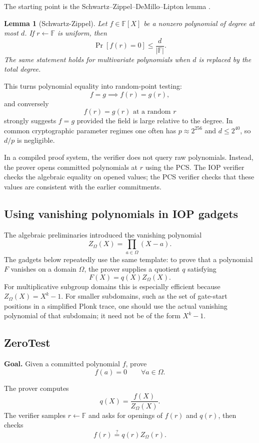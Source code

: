 \documentclass[11pt]{article}
\newcommand{\F}{\mathbb{F}}
\newtheorem{lemma}{Lemma}
\begin{document}
The starting point is the Schwartz--Zippel--DeMillo--Lipton lemma \cite{DeMilloLipton1978,Schwartz1980,Zippel1979}.

\begin{lemma}[Schwartz-Zippel]
Let $f\in \F[X]$ be a nonzero polynomial of degree at most $d$. If $r\leftarrow \F$ is uniform, then
\[
\Pr[f(r)=0]\le \frac{d}{|\F|}.
\]
The same statement holds for multivariate polynomials when $d$ is replaced by the total degree.
\end{lemma}

This turns polynomial equality into random-point testing:
\[
    f=g \implies f(r)=g(r),
\]
and conversely
\[
    f(r)=g(r) \text{ at a random }r
\]
strongly suggests $f=g$ provided the field is large relative to the degree. In common cryptographic parameter regimes one often has $p\approx 2^{256}$ and $d\le 2^{40}$, so $d/p$ is negligible.

In a compiled proof system, the verifier does not query raw polynomials. Instead, the prover opens committed polynomials at $r$ using the PCS. The IOP verifier checks the algebraic equality on opened values; the PCS verifier checks that these values are consistent with the earlier commitments.

\subsection{Using vanishing polynomials in IOP gadgets}

The algebraic preliminaries introduced the vanishing polynomial
\[
    Z_\Omega(X)=\prod_{a\in\Omega}(X-a).
\]
The gadgets below repeatedly use the same template: to prove that a polynomial $F$ vanishes on a domain $\Omega$, the prover supplies a quotient $q$ satisfying
\[
    F(X)=q(X)Z_\Omega(X).
\]
For multiplicative subgroup domains this is especially efficient because $Z_\Omega(X)=X^k-1$. For smaller subdomains, such as the set of gate-start positions in a simplified Plonk trace, one should use the actual vanishing polynomial of that subdomain; it need not be of the form $X^k-1$.

\subsection{ZeroTest}

\textbf{Goal.} Given a committed polynomial $f$, prove
\[
    f(a)=0\qquad\forall a\in\Omega.
\]

The prover computes
\[
    q(X)=\frac{f(X)}{Z_\Omega(X)}.
\]
The verifier samples $r\leftarrow\F$ and asks for openings of $f(r)$ and $q(r)$, then checks
\[
    f(r)\stackrel{?}{=}q(r)Z_\Omega(r).
\]
\end{document}
